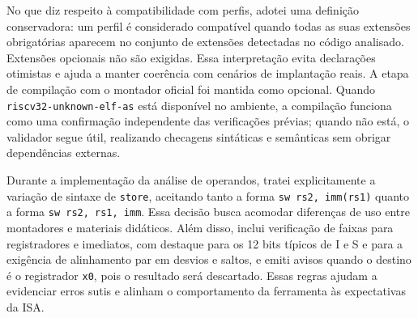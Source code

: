 \documentclass[12pt,a4paper]{article}
\begin{document}
No que diz respeito à compatibilidade com perfis, adotei uma definição conservadora: um perfil é considerado compatível quando todas as suas extensões obrigatórias aparecem no conjunto de extensões detectadas no código analisado. Extensões opcionais não são exigidas. Essa interpretação evita declarações otimistas e ajuda a manter coerência com cenários de implantação reais. A etapa de compilação com o montador oficial foi mantida como opcional. Quando \texttt{riscv32-unknown-elf-as} está disponível no ambiente, a compilação funciona como uma confirmação independente das verificações prévias; quando não está, o validador segue útil, realizando checagens sintáticas e semânticas sem obrigar dependências externas.

Durante a implementação da análise de operandos, tratei explicitamente a variação de sintaxe de \texttt{store}, aceitando tanto a forma \texttt{sw rs2, imm(rs1)} quanto a forma \texttt{sw rs2, rs1, imm}. Essa decisão busca acomodar diferenças de uso entre montadores e materiais didáticos. Além disso, inclui verificação de faixas para registradores e imediatos, com destaque para os 12 bits típicos de I e S e para a exigência de alinhamento par em desvios e saltos, e emiti avisos quando o destino é o registrador \texttt{x0}, pois o resultado será descartado. Essas regras ajudam a evidenciar erros sutis e alinham o comportamento da ferramenta às expectativas da ISA.
\end{document}
